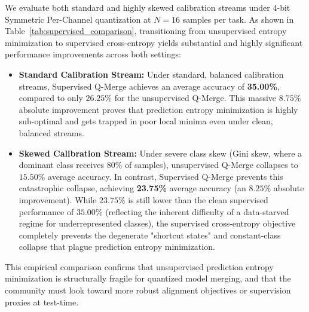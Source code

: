 We evaluate both standard and highly skewed calibration streams under 4-bit Symmetric Per-Channel quantization at $N=16$ samples per task. As shown in Table~\ref{tab:supervised_comparison}, transitioning from unsupervised entropy minimization to supervised cross-entropy yields substantial and highly significant performance improvements across both settings:
\begin{itemize}
    \item \textbf{Standard Calibration Stream:} Under standard, balanced calibration streams, Supervised Q-Merge achieves an average accuracy of \textbf{35.00\%}, compared to only $26.25\%$ for the unsupervised Q-Merge. This massive $8.75\%$ absolute improvement proves that prediction entropy minimization is highly sub-optimal and gets trapped in poor local minima even under clean, balanced streams.
    \item \textbf{Skewed Calibration Stream:} Under severe class skew (Gini skew, where a dominant class receives 80\% of samples), unsupervised Q-Merge collapses to $15.50\%$ average accuracy. In contrast, Supervised Q-Merge prevents this catastrophic collapse, achieving \textbf{23.75\%} average accuracy (an $8.25\%$ absolute improvement). While $23.75\%$ is still lower than the clean supervised performance of $35.00\%$ (reflecting the inherent difficulty of a data-starved regime for underrepresented classes), the supervised cross-entropy objective completely prevents the degenerate "shortcut states" and constant-class collapse that plague prediction entropy minimization.
\end{itemize}
This empirical comparison confirms that unsupervised prediction entropy minimization is structurally fragile for quantized model merging, and that the community must look toward more robust alignment objectives or supervision proxies at test-time.

